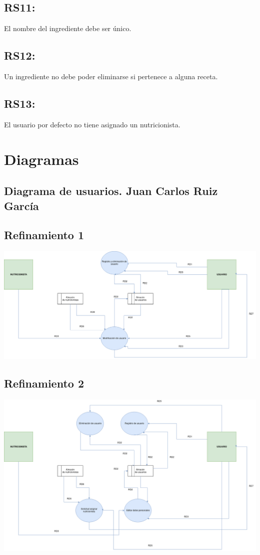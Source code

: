 \documentclass[12pt,letterpaper]{article}
\begin{document}
\subsection{RS11:} El nombre del ingrediente debe ser único.\\
\subsection{RS12:} Un ingrediente no debe poder eliminarse si pertenece a alguna receta.\\
\subsection{RS13:} El usuario por defecto no tiene asignado un nutricionista.\\

\newpage
\section{Diagramas}
\subsection{Diagrama de usuarios. Juan Carlos Ruiz García}
\subsection{Refinamiento 1}
\includegraphics[scale=0.3]{Refinamiento_1_Usuarios.png}
\subsection{Refinamiento 2}
\includegraphics[scale=0.3]{Refinamiento_2_Usuarios.png}
\newpage
\end{document}
